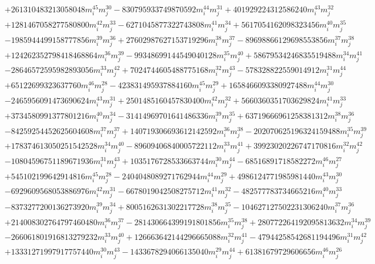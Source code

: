 {\begin{align*}
&+261310483213058048m_i^{45}m_j^{30}-830795933749870592m_i^{44}m_j^{31}+401929224312586240m_i^{43}m_j^{32}\\
&+1281467058277580800m_i^{42}m_j^{33}-6271045877322743808m_i^{41}m_j^{34}+5617054162098323456m_i^{40}m_j^{35}\\
&-1985944499158777856m_i^{39}m_j^{36}+27602987627153719296m_i^{38}m_j^{37}-89698866129698553856m_i^{37}m_j^{38}\\
&+124262352798418468864m_i^{36}m_j^{39}-99348699144549040128m_i^{35}m_j^{40}+58679534246835519488m_i^{34}m_j^{41}\\
&-28646572595982893056m_i^{33}m_j^{42}+7024744605488775168m_i^{32}m_j^{43}-578328822559014912m_i^{31}m_j^{44}\\
&+65122699323637760m_i^{46}m_j^{28}-423831495937884160m_i^{45}m_j^{29}+1658466093380927488m_i^{44}m_j^{30}\\
&-2465956091473690624m_i^{43}m_j^{31}+2501485160457830400m_i^{42}m_j^{32}+5660360351703629824m_i^{41}m_j^{33}\\
&+3734580991377801216m_i^{40}m_j^{34}-31414969701641486336m_i^{39}m_j^{35}+63719666961258381312m_i^{38}m_j^{36}\\
&-84259254452625604608m_i^{37}m_j^{37}+140719306693612142592m_i^{36}m_j^{38}-202070625196324159488m_i^{35}m_j^{39}\\
&+178374613050251542528m_i^{34}m_j^{40}-89609406840005722112m_i^{33}m_j^{41}+39923020226747170816m_i^{32}m_j^{42}\\
&-10804596751189671936m_i^{31}m_j^{43}+1035176728533663744m_i^{30}m_j^{44}-68516891718582272m_i^{46}m_j^{27}\\
&+545102199642914816m_i^{45}m_j^{28}-2404048089271762944m_i^{44}m_j^{29}+4986124771985981440m_i^{43}m_j^{30}\\
&-6929609568053886976m_i^{42}m_j^{31}-6678019042508275712m_i^{41}m_j^{32}-482577783734665216m_i^{40}m_j^{33}\\
&-8373277200136273920m_i^{39}m_j^{34}+8005162631302217728m_i^{38}m_j^{35}-104627127502231306240m_i^{37}m_j^{36}\\
&+214008302764797460480m_i^{36}m_j^{37}-281430664399191801856m_i^{35}m_j^{38}+280772264192095813632m_i^{34}m_j^{39}\\
&-266061801916813279232m_i^{33}m_j^{40}+126663642144296665088m_i^{32}m_j^{41}-47944258542681194496m_i^{31}m_j^{42}\\
&+13331271997917757440m_i^{30}m_j^{43}-1433678294066135040m_i^{29}m_j^{44}+61381679729606656m_i^{46}m_j^{26}\\

\end{align*}}
